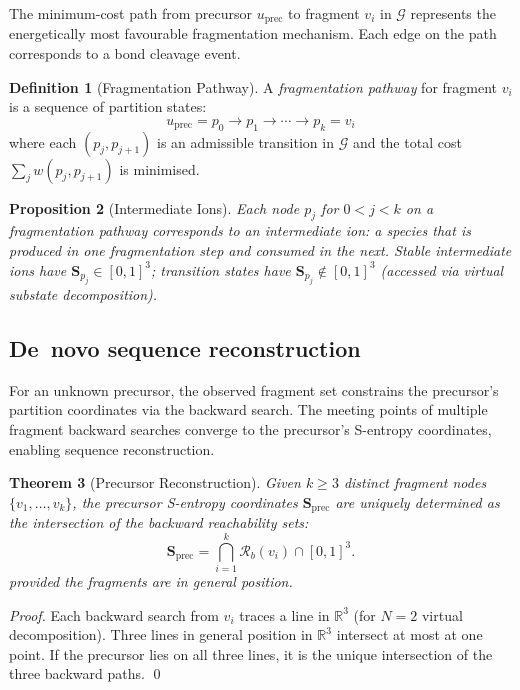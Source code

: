 \documentclass[twocolumn,10pt,a4paper]{article}
\theoremstyle{thmstyle}
\newtheorem{theorem}{Theorem}[section]
\newtheorem{proposition}[theorem]{Proposition}
\theoremstyle{definition}
\newtheorem{definition}[theorem]{Definition}
\theoremstyle{remark}
\newcommand{\R}{\mathbb{R}}
\newcommand{\Sv}{\mathbf{S}}
\newcommand{\calG}{\mathcal{G}}
\newcommand{\Reachb}{\mathcal{R}_b}
\begin{document}
The minimum-cost path from precursor $u_\text{prec}$ to fragment $v_i$
in $\calG$ represents the energetically most favourable fragmentation
mechanism. Each edge on the path corresponds to a bond cleavage event.

\begin{definition}[Fragmentation Pathway]
\label{def:pathway}
A \emph{fragmentation pathway} for fragment $v_i$ is a sequence of
partition states:
\begin{equation}
u_\text{prec} = p_0 \to p_1 \to \cdots \to p_k = v_i
\end{equation}
where each $(p_j, p_{j+1})$ is an admissible transition in $\calG$
and the total cost $\sum_j w(p_j, p_{j+1})$ is minimised.
\end{definition}

\begin{proposition}[Intermediate Ions]
\label{prop:intermediate}
Each node $p_j$ for $0 < j < k$ on a fragmentation pathway corresponds
to an intermediate ion: a species that is produced in one fragmentation
step and consumed in the next. Stable intermediate ions have
$\Sv_{p_j} \in [0,1]^3$; transition states have
$\Sv_{p_j} \notin [0,1]^3$ (accessed via virtual substate decomposition).
\end{proposition}

\subsection{De~novo sequence reconstruction}

For an unknown precursor, the observed fragment set constrains the
precursor's partition coordinates via the backward search. The meeting
points of multiple fragment backward searches converge to the precursor's
S-entropy coordinates, enabling sequence reconstruction.

\begin{theorem}[Precursor Reconstruction]
\label{thm:reconstruction}
Given $k \geq 3$ distinct fragment nodes $\{v_1, \ldots, v_k\}$, the
precursor S-entropy coordinates $\Sv_\text{prec}$ are uniquely determined
as the intersection of the backward reachability sets:
\begin{equation}
\Sv_\text{prec} = \bigcap_{i=1}^{k} \Reachb(v_i) \cap [0,1]^3.
\end{equation}
provided the fragments are in general position.
\end{theorem}

\begin{proof}
Each backward search from $v_i$ traces a line in $\R^3$ (for $N=2$
virtual decomposition). Three lines in general position in $\R^3$
intersect at most at one point. If the precursor lies on all three
lines, it is the unique intersection of the three backward paths.
\qed
\end{proof}
\end{document}

